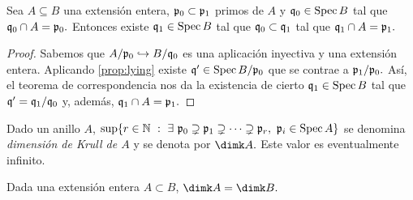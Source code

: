\documentclass[../main.tex]{subfiles}
\begin{document}
\begin{theorem}[Going-up]
Sea $A\subseteq B$ una extensión entera, $\mathfrak{p}_0\subset\mathfrak{p}_1$ primos de $A$ y $\mathfrak{q}_0\in\operatorname{Spec} B$ tal que $\mathfrak{q}_0\cap  A=\mathfrak{p}_0.$ Entonces existe $\mathfrak{q}_1\in\operatorname{Spec} B$ tal que $\mathfrak{q}_0\subset\mathfrak{q}_1$ tal que $\mathfrak{q}_1\cap A=\mathfrak{p}_1.$
\end{theorem}

\begin{proof}
Sabemos que $A/\mathfrak{p}_0\hookrightarrow B/\mathfrak{q}_0$ es una aplicación inyectiva y una extensión entera. Aplicando \ref{prop:lying} existe $\mathfrak{q}'\in\operatorname{Spec} {B/\mathfrak{p}_0}$ que se contrae a $\mathfrak{p}_1/\mathfrak{p}_0.$ Así, el teorema de correspondencia nos da la existencia de cierto $\mathfrak{q}_1\in\operatorname{Spec} B$ tal que $\mathfrak{q}'=\mathfrak{q}_1/\mathfrak{q}_0$ y, además, $\mathfrak{q}_1\cap A=\mathfrak{p}_1.$
\end{proof}

\begin{definition}
Dado un anillo $A$, $\sup\{r\in\N\ :\ \exists\ \p_0\supsetneq\p_1\supsetneq\cdots\supsetneq\p_r,\ \p_i\in\Spec A\}$ se denomina \textit{dimensión de Krull de $A$} y se denota por $\dimk A.$ Este valor es eventualmente infinito.
\end{definition}

\begin{corollary}
Dada una extensión entera $A\subset B$, $\dimk A=\dimk B.$
\end{corollary}
\end{document}
